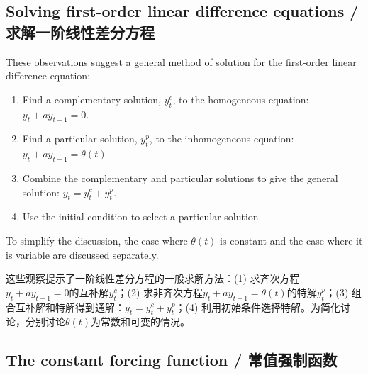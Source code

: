 \subsection{Solving first-order linear difference equations / 求解一阶线性差分方程}

\begin{original}
These observations suggest a general method of solution for the first-order linear difference equation:
\begin{enumerate}
\item Find a complementary solution, $y_t^c$, to the homogeneous equation: $y_t + a y_{t-1} = 0$.
\item Find a particular solution, $y_t^p$, to the inhomogeneous equation: $y_t + a y_{t-1} = \theta(t)$.
\item Combine the complementary and particular solutions to give the general solution: $y_t = y_t^c + y_t^p$.
\item Use the initial condition to select a particular solution.
\end{enumerate}

To simplify the discussion, the case where $\theta(t)$ is constant and the case where it is variable are discussed separately.
\end{original}
\begin{translation}
这些观察提示了一阶线性差分方程的一般求解方法：(1) 求齐次方程$y_t + a y_{t-1} = 0$的互补解$y_t^c$；(2) 求非齐次方程$y_t + a y_{t-1} = \theta(t)$的特解$y_t^p$；(3) 组合互补解和特解得到通解：$y_t = y_t^c + y_t^p$；(4) 利用初始条件选择特解。为简化讨论，分别讨论$\theta(t)$为常数和可变的情况。
\end{translation}
\subsection{The constant forcing function / 常值强制函数}

